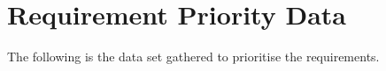 \chapter{Requirement Priority Data} \label{reqprio}
The following is the data set gathered to prioritise the requirements. 

